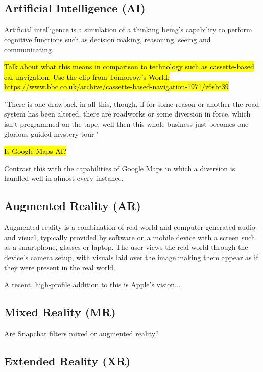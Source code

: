 \documentclass{article}
\begin{document}
\subsection{Artificial Intelligence (AI)}

Artificial intelligence is a simulation of a thinking being's capability to perform cognitive functions such as decision making, reasoning, seeing and communicating.


\hl{Talk about what this means in comparison to technology such as cassette-based car navigation. Use the clip from Tomorrow's World: https://www.bbc.co.uk/archive/cassette-based-navigation-1971/z6sbt39}

"There is one drawback in all this, though, if for some reason or another the road system has been altered, there are roadworks or some diversion in force, which isn't programmed on the tape, well then this whole business just becomes one glorious guided mystery tour."

\hl{Is Google Maps AI?}

Contrast this with the capabilities of Google Maps in which a diversion is handled well in almost every instance.

\subsection{Augmented Reality (AR)}

Augmented reality is a combination of real-world and computer-generated audio and visual, typically provided by software on a mobile device with a screen such as a smartphone, glasses or laptop. The user views the real world through the device's camera setup, with visuals laid over the image making them appear as if they were present in the real world.

A recent, high-profile addition to this is Apple's vision...



\subsection{Mixed Reality (MR)}


Are Snapchat filters mixed or augmented reality?

\subsection{Extended Reality (XR)}
\end{document}
